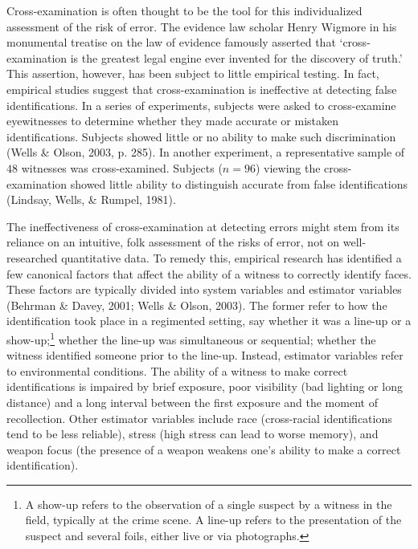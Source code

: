\documentclass[
  letterpaper,
  DIV=11,
  numbers=noendperiod]{scrartcl}
\begin{document}
Cross-examination is often thought to be the tool for this
individualized assessment of the risk of error. The evidence law scholar
Henry Wigmore in his monumental treatise on the law of evidence famously
asserted that `cross-examination is the greatest legal engine ever
invented for the discovery of truth.' This assertion, however, has been
subject to little empirical testing. In fact, empirical studies suggest
that cross-examination is ineffective at detecting false
identifications. In a series of experiments, subjects were asked to
cross-examine eyewitnesses to determine whether they made accurate or
mistaken identifications. Subjects showed little or no ability to make
such discrimination (Wells \& Olson, 2003, p. 285). In another
experiment, a representative sample of \(48\) witnesses was
cross-examined. Subjects (\(n = 96\)) viewing the cross-examination
showed little ability to distinguish accurate from false identifications
(Lindsay, Wells, \& Rumpel, 1981).

The ineffectiveness of cross-examination at detecting errors might stem
from its reliance on an intuitive, folk assessment of the risks of
error, not on well-researched quantitative data. To remedy this,
empirical research has identified a few canonical factors that affect
the ability of a witness to correctly identify faces. These factors are
typically divided into system variables and estimator variables (Behrman
\& Davey, 2001; Wells \& Olson, 2003). The former refer to how the
identification took place in a regimented setting, say whether it was a
line-up or a
show-up;\footnote{A show-up refers to the observation of a single suspect by a witness in the field, typically at the crime scene. A line-up refers to the presentation of the suspect and several foils, either live or via photographs.}
whether the line-up was simultaneous or sequential; whether the witness
identified someone prior to the line-up. Instead, estimator variables
refer to environmental conditions. The ability of a witness to make
correct identifications is impaired by brief exposure, poor visibility
(bad lighting or long distance) and a long interval between the first
exposure and the moment of recollection. Other estimator variables
include race (cross-racial identifications tend to be less reliable),
stress (high stress can lead to worse memory), and weapon focus (the
presence of a weapon weakens one's ability to make a correct
identification).
\end{document}
